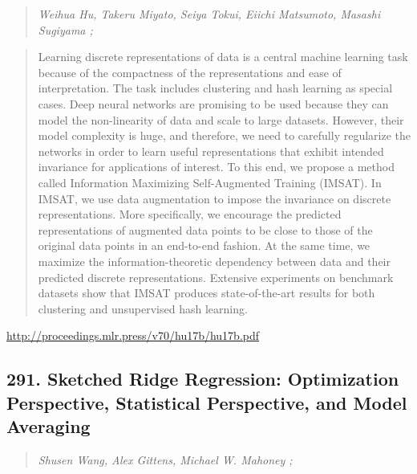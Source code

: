 \documentclass{article}
\begin{document}
\begin{quote}
\footnotesize{\textit{Weihua Hu, Takeru Miyato, Seiya Tokui, Eiichi Matsumoto, Masashi Sugiyama ;}}

\end{quote}

\begin{quote}
    Learning discrete representations of data is a central machine learning task because of the compactness of the representations and ease of interpretation. The task includes clustering and hash learning as special cases. Deep neural networks are promising to be used because they can model the non-linearity of data and scale to large datasets. However, their model complexity is huge, and therefore, we need to carefully regularize the networks in order to learn useful representations that exhibit intended invariance for applications of interest. To this end, we propose a method called Information Maximizing Self-Augmented Training (IMSAT). In IMSAT, we use data augmentation to impose the invariance on discrete representations. More specifically, we encourage the predicted representations of augmented data points to be close to those of the original data points in an end-to-end fashion. At the same time, we maximize the information-theoretic dependency between data and their predicted discrete representations. Extensive experiments on benchmark datasets show that IMSAT produces state-of-the-art results for both clustering and unsupervised hash learning.  
\end{quote}

\href{http://proceedings.mlr.press/v70/hu17b/hu17b.pdf}{http://proceedings.mlr.press/v70/hu17b/hu17b.pdf}

\subsection{291. Sketched Ridge Regression: Optimization Perspective, Statistical Perspective, and Model Averaging}

\begin{quote}
\footnotesize{\textit{Shusen Wang, Alex Gittens, Michael W. Mahoney ;}}

\end{quote}
\end{document}
